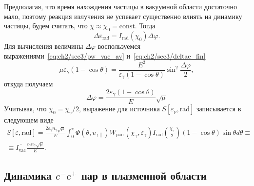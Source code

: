 Предполагая, что время нахождения частицы в вакуумной области достаточно мало, поэтому реакция излучения не успевает существенно влиять на динамику частицы, будем считать, что $\chi\approx\chi_0=\text{const}$.
Тогда
\begin{equation}
    \Delta\varepsilon_\mathrm{rad} = I_\mathrm{rad}(\chi_0)\Delta\varphi.
\end{equation}
Для вычисления величины $\Delta\varphi$ воспользуемся выражениями~\eqref{eq:ch2/sec3/pw_vac_av} и~\eqref{eq:ch2/sec3/deltae_fin}
\begin{equation}
    \mu \varepsilon_\gamma (1 - \cos\theta) = \frac{E^2}{\varepsilon_\gamma (1 - \cos\theta)}\sin^2\frac{\Delta\varphi}{2},
\end{equation}
откуда получаем
\begin{equation}
    \Delta\varphi =  \frac{2\varepsilon_\gamma (1 - \cos\theta)}{E}\sqrt{\mu}
\end{equation}
Учитывая, что $\chi_0 = \chi_\gamma / 2$, выражение для источника $S[\varepsilon_p, \mathrm{rad}]$ записывается в следующем виде
\begin{multline}
    S[\varepsilon, \mathrm{rad}] = \frac{2 \varepsilon_\gamma n_\gamma \sqrt{\mu}}{E} \int_0^\pi \Phi(\theta, v_{\gamma\parallel}) W_\mathrm{pair}(\chi_\gamma, \varepsilon_\gamma) I_\mathrm{rad} \left( \frac{\chi_\gamma}{2} \right)(1 - \cos\theta)\sin\theta d\theta \equiv \\
    \equiv \overline{I_\mathrm{vac}} \frac{\varepsilon_\gamma n_\gamma \sqrt{\mu}}{E} .
\end{multline}

\subsection{Динамика $e^-e^+$ пар в плазменной области}
\label{sub.Pairs}


